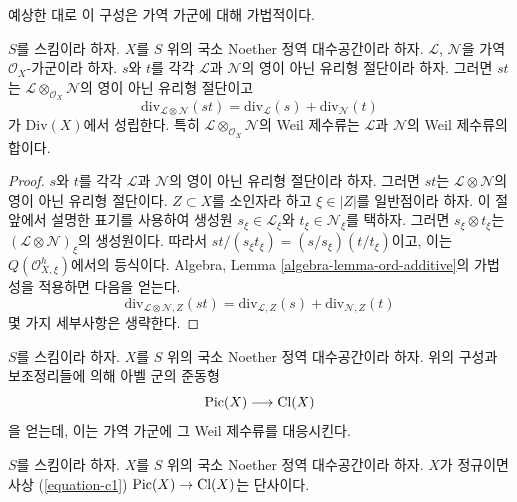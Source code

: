 \noindent
예상한 대로 이 구성은 가역 가군에 대해 가법적이다.

\begin{lemma}
\label{lemma-c1-additive}
$S$를 스킴이라 하자. $X$를 $S$ 위의 국소 Noether 정역 대수공간이라
하자. $\mathcal{L}$, $\mathcal{N}$을 가역 $\mathcal{O}_X$-가군이라
하자. $s$와 $t$를 각각 $\mathcal{L}$과 $\mathcal{N}$의 영이 아닌
유리형 절단이라 하자. 그러면 $st$는 $\mathcal{L}
\otimes_{\mathcal{O}_X} \mathcal{N}$의 영이 아닌 유리형 절단이고
$$
\text{div}_{\mathcal{L} \otimes \mathcal{N}}(st)
=
\text{div}_\mathcal{L}(s) + \text{div}_\mathcal{N}(t)
$$
가 $\text{Div}(X)$에서 성립한다. 특히 $\mathcal{L}
\otimes_{\mathcal{O}_X} \mathcal{N}$의 Weil 제수류는 $\mathcal{L}$과
$\mathcal{N}$의 Weil 제수류의 합이다.
\end{lemma}

\begin{proof}
$s$와 $t$를 각각 $\mathcal{L}$과 $\mathcal{N}$의 영이 아닌 유리형
절단이라 하자. 그러면 $st$는 $\mathcal{L} \otimes \mathcal{N}$의
영이 아닌 유리형 절단이다. $Z \subset X$를 소인자라 하고
$\xi \in |Z|$를 일반점이라 하자. 이 절 앞에서 설명한 표기를 사용하여
생성원 $s_\xi \in \mathcal{L}_\xi$와 $t_\xi \in \mathcal{N}_\xi$를
택하자. 그러면 $s_\xi \otimes t_\xi$는
$(\mathcal{L} \otimes \mathcal{N})_\xi$의 생성원이다. 따라서
$st/(s_\xi t_\xi) = (s/s_\xi)(t/t_\xi)$이고, 이는
$Q(\mathcal{O}_{X, \xi}^h)$에서의 등식이다. Algebra, Lemma
\ref{algebra-lemma-ord-additive}의 가법성을 적용하면 다음을 얻는다.
$$
\text{div}_{\mathcal{L} \otimes \mathcal{N}, Z}(st)
=
\text{div}_{\mathcal{L}, Z}(s) + \text{div}_{\mathcal{N}, Z}(t)
$$
몇 가지 세부사항은 생략한다.
\end{proof}

\noindent
$S$를 스킴이라 하자. $X$를 $S$ 위의 국소 Noether 정역 대수공간이라
하자. 위의 구성과 보조정리들에 의해 아벨 군의 준동형
\begin{equation}
\label{equation-c1}
\mathop{\mathrm{Pic}}\nolimits(X) \longrightarrow \text{Cl}(X)
\end{equation}
을 얻는데, 이는 가역 가군에 그 Weil 제수류를 대응시킨다.

\begin{lemma}
\label{lemma-normal-c1-injective}
$S$를 스킴이라 하자. $X$를 $S$ 위의 국소 Noether 정역 대수공간이라
하자. $X$가 정규이면 사상 (\ref{equation-c1})
$\mathop{\mathrm{Pic}}\nolimits(X) \to \text{Cl}(X)$는 단사이다.
\end{lemma}


